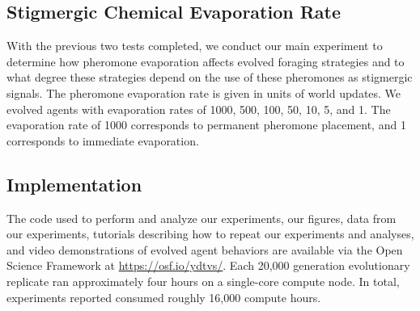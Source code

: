 \subsection*{Stigmergic Chemical Evaporation Rate}

With the previous two tests completed, we conduct our main experiment to determine how pheromone evaporation affects evolved foraging strategies and to what degree these strategies depend on the use of these pheromones as stigmergic signals. The pheromone evaporation rate is given in units of world updates. We evolved agents with evaporation rates of 1000, 500, 100, 50, 10, 5, and 1. The evaporation rate of 1000 corresponds to permanent pheromone placement, and 1 corresponds to immediate evaporation.

\subsection*{Implementation}

The code used to perform and analyze our experiments, our figures, data from our experiments, tutorials describing how to repeat our experiments and analyses, and video demonstrations of evolved agent behaviors are available via the Open Science Framework at \url{https://osf.io/ydtvs/}.
Each 20,000 generation evolutionary replicate ran approximately four hours on a single-core compute node.
In total, experiments reported consumed roughly 16,000 compute hours.